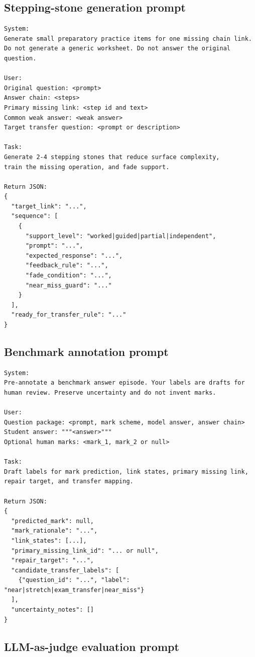\documentclass[11pt]{article}
\begin{document}
\subsection{Stepping-stone generation prompt}

\begin{verbatim}
System:
Generate small preparatory practice items for one missing chain link.
Do not generate a generic worksheet. Do not answer the original question.

User:
Original question: <prompt>
Answer chain: <steps>
Primary missing link: <step id and text>
Common weak answer: <weak answer>
Target transfer question: <prompt or description>

Task:
Generate 2-4 stepping stones that reduce surface complexity,
train the missing operation, and fade support.

Return JSON:
{
  "target_link": "...",
  "sequence": [
    {
      "support_level": "worked|guided|partial|independent",
      "prompt": "...",
      "expected_response": "...",
      "feedback_rule": "...",
      "fade_condition": "...",
      "near_miss_guard": "..."
    }
  ],
  "ready_for_transfer_rule": "..."
}
\end{verbatim}

\subsection{Benchmark annotation prompt}

\begin{verbatim}
System:
Pre-annotate a benchmark answer episode. Your labels are drafts for
human review. Preserve uncertainty and do not invent marks.

User:
Question package: <prompt, mark scheme, model answer, answer chain>
Student answer: """<answer>"""
Optional human marks: <mark_1, mark_2 or null>

Task:
Draft labels for mark prediction, link states, primary missing link,
repair target, and transfer mapping.

Return JSON:
{
  "predicted_mark": null,
  "mark_rationale": "...",
  "link_states": [...],
  "primary_missing_link_id": "... or null",
  "repair_target": "...",
  "candidate_transfer_labels": [
    {"question_id": "...", "label": "near|stretch|exam_transfer|near_miss"}
  ],
  "uncertainty_notes": []
}
\end{verbatim}

\subsection{LLM-as-judge evaluation prompt}
\end{document}
